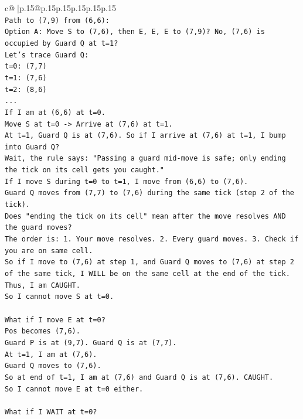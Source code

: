 \documentclass{article}
\begin{document}
{\begin{supertabular}{c@{$\;$}|p{.15\linewidth}@{}p{.15\linewidth}p{.15\linewidth}p{.15\linewidth}p{.15\linewidth}p{.15\linewidth}}
{{{\\ 
\texttt{Path to (7,9) from (6,6):} \\
\texttt{Option A: Move S to (7,6), then E, E, E to (7,9)? No, (7,6) is occupied by Guard Q at t=1?} \\
\texttt{Let's trace Guard Q:} \\
\texttt{t=0: (7,7)} \\
\texttt{t=1: (7,6)} \\
\texttt{t=2: (8,6)} \\
\texttt{...} \\
\texttt{If I am at (6,6) at t=0.} \\
\texttt{Move S at t=0 {-}> Arrive at (7,6) at t=1.} \\
\texttt{At t=1, Guard Q is at (7,6). So if I arrive at (7,6) at t=1, I bump into Guard Q?} \\
\texttt{Wait, the rule says: "Passing a guard mid{-}move is safe; only ending the tick on its cell gets you caught."} \\
\texttt{If I move S during t=0 to t=1, I move from (6,6) to (7,6).} \\
\texttt{Guard Q moves from (7,7) to (7,6) during the same tick (step 2 of the tick).} \\
\texttt{Does "ending the tick on its cell" mean after the move resolves AND the guard moves?} \\
\texttt{The order is: 1. Your move resolves. 2. Every guard moves. 3. Check if you are on same cell.} \\
\texttt{So if I move to (7,6) at step 1, and Guard Q moves to (7,6) at step 2 of the same tick, I WILL be on the same cell at the end of the tick. Thus, I am CAUGHT.} \\
\texttt{So I cannot move S at t=0.} \\
\\ 
\texttt{What if I move E at t=0?} \\
\texttt{Pos becomes (7,6).} \\
\texttt{Guard P is at (9,7). Guard Q is at (7,7).} \\
\texttt{At t=1, I am at (7,6).} \\
\texttt{Guard Q moves to (7,6).} \\
\texttt{So at end of t=1, I am at (7,6) and Guard Q is at (7,6). CAUGHT.} \\
\texttt{So I cannot move E at t=0 either.} \\
\\ 
\texttt{What if I WAIT at t=0?} \\
}}}
\end{supertabular}}
\end{document}
